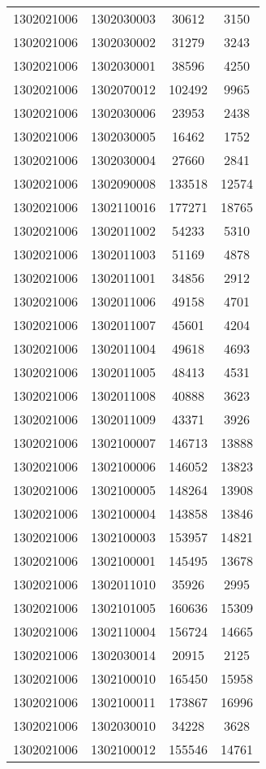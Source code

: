 \begin{longtable}[h]{llcc}
		1302021006 & 1302030003 & 30612 & 3150\\
		1302021006 & 1302030002 & 31279 & 3243\\
		1302021006 & 1302030001 & 38596 & 4250\\
		1302021006 & 1302070012 & 102492 & 9965\\
		1302021006 & 1302030006 & 23953 & 2438\\
		1302021006 & 1302030005 & 16462 & 1752\\
		1302021006 & 1302030004 & 27660 & 2841\\
		1302021006 & 1302090008 & 133518 & 12574\\
		1302021006 & 1302110016 & 177271 & 18765\\
		1302021006 & 1302011002 & 54233 & 5310\\
		1302021006 & 1302011003 & 51169 & 4878\\
		1302021006 & 1302011001 & 34856 & 2912\\
		1302021006 & 1302011006 & 49158 & 4701\\
		1302021006 & 1302011007 & 45601 & 4204\\
		1302021006 & 1302011004 & 49618 & 4693\\
		1302021006 & 1302011005 & 48413 & 4531\\
		1302021006 & 1302011008 & 40888 & 3623\\
		1302021006 & 1302011009 & 43371 & 3926\\
		1302021006 & 1302100007 & 146713 & 13888\\
		1302021006 & 1302100006 & 146052 & 13823\\
		1302021006 & 1302100005 & 148264 & 13908\\
		1302021006 & 1302100004 & 143858 & 13846\\
		1302021006 & 1302100003 & 153957 & 14821\\
		1302021006 & 1302100001 & 145495 & 13678\\
		1302021006 & 1302011010 & 35926 & 2995\\
		1302021006 & 1302101005 & 160636 & 15309\\
		1302021006 & 1302110004 & 156724 & 14665\\
		1302021006 & 1302030014 & 20915 & 2125\\
		1302021006 & 1302100010 & 165450 & 15958\\
		1302021006 & 1302100011 & 173867 & 16996\\
		1302021006 & 1302030010 & 34228 & 3628\\
		1302021006 & 1302100012 & 155546 & 14761\\

\end{longtable}
